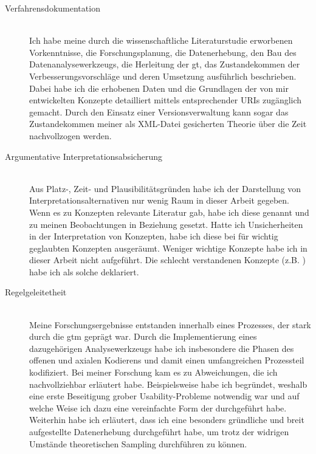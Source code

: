 \begin{description}
  \item[Verfahrensdokumentation] \hfill \\
  Ich habe meine durch die wissenschaftliche Literaturstudie erworbenen Vorkenntnisse, die Forschungsplanung, die Datenerhebung, den Bau des Datenanalysewerkzeugs, die Herleitung der \gls{gt}, das Zustandekommen der Verbesserungsvorschläge und deren Umsetzung ausführlich beschrieben. Dabei habe ich die erhobenen Daten und die Grundlagen der von mir entwickelten Konzepte detailliert mittels entsprechender URIs zugänglich gemacht. Durch den Einsatz einer Versionsverwaltung kann sogar das Zustandekommen meiner als XML-Datei gesicherten Theorie über die Zeit nachvollzogen werden.
  
  \item[Argumentative Interpretationsabsicherung] \hfill \\
  Aus Platz-, Zeit- und Plausibilitätsgründen habe ich der Darstellung von Interpretationsalternativen nur wenig Raum in dieser Arbeit gegeben. Wenn es zu Konzepten relevante Literatur gab, habe ich diese genannt und zu meinen Beobachtungen in Beziehung gesetzt. Hatte ich Unsicherheiten in der Interpretation von Konzepten, habe ich diese bei für wichtig geglaubten Konzepten ausgeräumt. Weniger wichtige Konzepte habe ich in dieser Arbeit nicht aufgeführt. Die schlecht verstandenen Konzepte (z.B. ) habe ich als solche deklariert.
  
  \item[Regelgeleitetheit] \hfill \\
  Meine Forschungsergebnisse entstanden innerhalb eines Prozesses, der stark durch die \gls{gtm} geprägt war. Durch die Implementierung eines dazugehörigen Analysewerkzeugs habe ich insbesondere die Phasen des offenen und axialen Kodierens und damit einen umfangreichen Prozessteil kodifiziert. Bei meiner Forschung kam es zu Abweichungen, die ich nachvollziehbar erläutert habe. Beispielsweise habe ich begründet, weshalb eine erste Beseitigung grober Usability-Probleme notwendig war und auf welche Weise ich dazu eine vereinfachte Form der  durchgeführt habe. Weiterhin habe ich erläutert, dass ich eine besonders gründliche und breit aufgestellte Datenerhebung durchgeführt habe, um trotz der widrigen Umstände theoretischen Sampling durchführen zu können.
  

\end{description}
